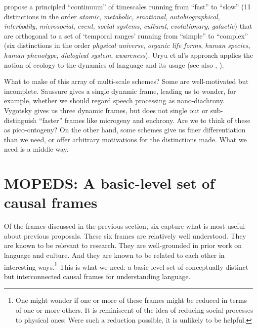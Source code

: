 \citet{uryu_ecology_2014} propose a principled ``continuum'' of timescales running from 
``fast'' to ``slow'' (11 distinctions in the order \textit{atomic}, 
\textit{metabolic}, \textit{emotional}, \textit{autobiographical}, \textit{interbodily}, \textit{microsocial}, \textit{event}, 
\textit{social systems}, \textit{cultural}, \textit{evolutionary}, \textit{galactic}) that are orthogonal to a set of \textquoteleft temporal 
ranges' running from ``simple'' to ``complex'' (six distinctions in the 
order \textit{physical universe}, \textit{organic life forms}, 
\textit{human species}, \textit{human phenotype}, \textit{
dialogical system}, \textit{awareness}). Uryu et al's approach 
applies the notion of ecology to the dynamics of language and its usage (see also \citealt{cowley_distributed_2011}, \citealt{steffenson_ecolinguistics:_2013}).



What to make of this array of multi-scale schemes? Some are well-motivated but incomplete. Saussure gives 
a single dynamic frame, leading us to wonder, for example, whether we 
should regard speech processing as nano-diachrony. Vygotsky gives us three dynamic frames, but does not single out or 
sub-distinguish ``faster'' frames like microgeny and enchrony. Are we to 
think of these as pico-ontogeny? On the other hand, some schemes give us 
finer differentiation than we need, or offer arbitrary 
motivations for the distinctions made. What we need is a middle way. 



\section{MOPEDS: A basic-level set of causal frames}

Of the frames discussed in the previous section, six capture 
what is most useful about previous proposals. These six frames are relatively well understood. They are known to be 
relevant to research. They are well-grounded in prior work on language and 
culture. And they are known to be related to each other in interesting ways.\footnote{One might wonder if one or more of these frames might be reduced in terms of one or more others. It is reminiscent of the idea of reducing social processes to physical ones: Were such a reduction possible, it is unlikely to be helpful.} This is what we need: a basic-level set of conceptually 
distinct but interconnected causal frames for understanding language. 



